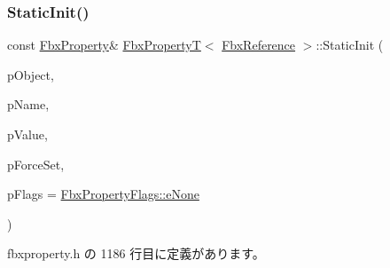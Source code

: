 \subsubsection{\texorpdfstring{Static\+Init()}{StaticInit()}\hspace{0.1cm}{\footnotesize\ttfamily [1/2]}}
{\footnotesize\ttfamily const \hyperlink{class_fbx_property}{Fbx\+Property}\& \hyperlink{class_fbx_property_t}{Fbx\+PropertyT}$<$ \hyperlink{fbxtypes_8h_a44df6a2eec915cf27cd481e5c5e48a24}{Fbx\+Reference} $>$\+::Static\+Init (\begin{DoxyParamCaption}\item[{\hyperlink{class_fbx_object}{Fbx\+Object} $\ast$}]{p\+Object,  }\item[{const char $\ast$}]{p\+Name,  }\item[{const \hyperlink{fbxtypes_8h_a44df6a2eec915cf27cd481e5c5e48a24}{Fbx\+Reference} \&}]{p\+Value,  }\item[{bool}]{p\+Force\+Set,  }\item[{\hyperlink{class_fbx_property_flags_afabfa7e0949aac8a7dcdf8a141867e99}{Fbx\+Property\+Flags\+::\+E\+Flags}}]{p\+Flags = {\ttfamily \hyperlink{class_fbx_property_flags_afabfa7e0949aac8a7dcdf8a141867e99ac1b9aab93d40af76eb419be426de17b1}{Fbx\+Property\+Flags\+::e\+None}} }\end{DoxyParamCaption})\hspace{0.3cm}{\ttfamily [inline]}}



 fbxproperty.\+h の 1186 行目に定義があります。

\mbox{\label{class_fbx_property_t_3_01_fbx_reference_01_4_ae6f72c54ae167513f7975c56bfeb0281}} 
